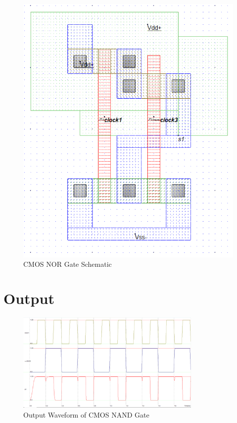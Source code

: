 \documentclass[12pt]{article}
\begin{document}
\begin{figure}[H]
    \begin{minipage}{0.48\textwidth}
        \centering
        \includegraphics[width=\textwidth]{3Nor.png}
        \caption{CMOS NOR Gate Schematic}
    \end{minipage}
\end{figure}

\section*{Output}

\begin{figure}[H]
    \centering
    \includegraphics[width=0.8\textwidth]{3Nand_tt.png}
    \caption{Output Waveform of CMOS NAND Gate}
\end{figure}
\end{document}
